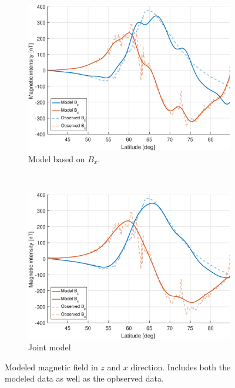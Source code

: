 \begin{figure}[ht]
    ~ %
    \begin{subfigure}[b]{0.45\textwidth}
        \includegraphics[width=\textwidth]{fig/BxModel.eps}
        \caption{Model based on $B_x$.}
        \label{fig:BxModel}
    \end{subfigure}
    ~ %
    \begin{subfigure}[b]{0.45\textwidth}
        \includegraphics[width=\textwidth]{fig/BjModel.eps}
        \caption{Joint model}
        \label{fig:BjModel}
    \end{subfigure}
    \caption{Modeled magnetic field in $z$ and $x$ direction. Includes both the modeled data as well as the opbserved data.}
    \label{fig:model}
\end{figure}


